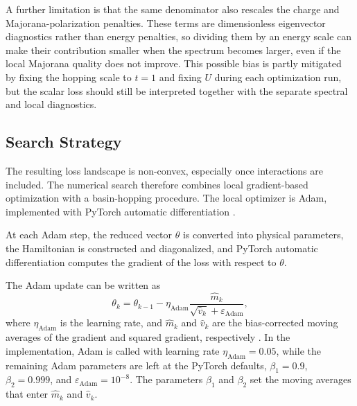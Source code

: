 A further limitation is that the same denominator also rescales the charge and Majorana-polarization penalties. These terms are dimensionless eigenvector diagnostics rather than energy penalties, so dividing them by an energy scale can make their contribution smaller when the spectrum becomes larger, even if the local Majorana quality does not improve. This possible bias is partly mitigated by fixing the hopping scale to $t=1$ and fixing $U$ during each optimization run, but the scalar loss should still be interpreted together with the separate spectral and local diagnostics.



\subsection{Search Strategy}
The resulting loss landscape is non-convex, especially once interactions are included. The numerical search therefore combines local gradient-based optimization with a basin-hopping procedure. The local optimizer is Adam, implemented with PyTorch automatic differentiation \cite{paszke2017automatic,kingma2014adam}.

At each Adam step, the reduced vector $\theta$ is converted into physical parameters, the Hamiltonian is constructed and diagonalized, and PyTorch automatic differentiation computes the gradient of the loss with respect to $\theta$.

The Adam update can be written as
\begin{equation}
\theta_k
=
\theta_{k-1}
-
\eta_{\mathrm{Adam}}
\frac{\hat{m}_k}{\sqrt{\hat{v}_k}+\varepsilon_{\mathrm{Adam}}},
\end{equation}
where $\eta_{\mathrm{Adam}}$ is the learning rate, and $\hat{m}_k$ and $\hat{v}_k$ are the bias-corrected moving averages of the gradient and squared gradient, respectively \cite{kingma2014adam}. In the implementation, Adam is called with learning rate $\eta_{\mathrm{Adam}}=0.05$, while the remaining Adam parameters are left at the PyTorch defaults, $\beta_1=0.9$, $\beta_2=0.999$, and $\varepsilon_{\mathrm{Adam}}=10^{-8}$. The parameters $\beta_1$ and $\beta_2$ set the moving averages that enter $\hat{m}_k$ and $\hat{v}_k$.

